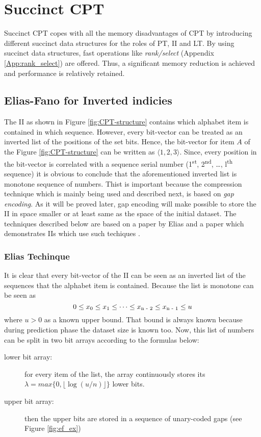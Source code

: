 \section{Succinct CPT}\label{ccpt}
Succinct CPT copes with all the memory disadvantages of CPT by introducing different succinct data structures for the roles of PT, II and LT. By using succinct data structures, fast operations like \emph{rank/select} (Appendix \ref{App:rank_select}) are offered. Thus, a significant memory reduction is achieved and performance is relatively retained.
\subsection{Elias-Fano for Inverted indicies}
The II as shown in Figure \ref{fig:CPT-structure} contains which alphabet item is contained in which sequence. However, every bit-vector can be treated as an inverted list of the positions of the set bits. Hence, the bit-vector for item \(A\) of the Figure \ref{fig:CPT-structure} can be written as \(\langle 1, 2, 3\rangle\). Since, every position in the bit-vector is correlated with a sequence serial number (1\textsuperscript{st}, 2\textsuperscript{nd}, \dots, l\textsuperscript{th} sequence) it is obvious to conclude that the aforementioned inverted list is monotone sequence of numbers. Thist is important because  the compression technique which is mainly being used and described next, is based on \emph{gap encoding}. As it will be proved later, gap encoding will make possible to store the II in space smaller or at least same as the space of the initial dataset. The techniques described below are based on a paper by Elias \cite{elias_efficient_1974} and a paper which demonstrates IIs which use such techiques \cite{vigna_quasi-succinct_2013}.
\subsubsection{Elias Techinque}
\par It is clear that every bit-vector of the II can be seen as an inverted list of the sequences that the alphabet item is contained. Because the list is monotone can be seen as \[0 \leq x\textsubscript{0} \leq x\textsubscript{1} \leq \dots \leq x\textsubscript{n - 2} \leq x\textsubscript{n - 1} \leq u \] where \(u > 0 \) as a known upper bound. That bound is always known because during prediction phase the dataset size is known too. Now, this list of numbers can be split in two bit arrays according to the formulas below:
	\begin{description}
  	\item[lower bit array:] for every item of the list, the array continuously stores its \( \lambda = max\{0, \lfloor \log(u/n)\rfloor\}\) lower bits.
  	\item[upper bit array:] then the upper bits are stored in a sequence of unary-coded gaps (see Figure \ref{fig:ef_ex})
	\end{description}

